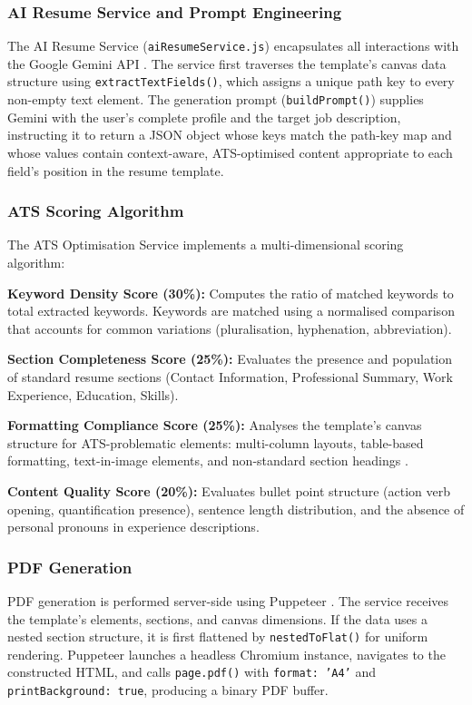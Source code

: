 \documentclass[12pt, a4paper, oneside]{report}
\begin{document}
\subsubsection{AI Resume Service and Prompt Engineering}

The AI Resume Service (\texttt{aiResumeService.js}) encapsulates all interactions with the Google Gemini API \cite{gemini2023}. The service first traverses the template's canvas data structure using \texttt{extractTextFields()}, which assigns a unique path key to every non-empty text element. The generation prompt (\texttt{buildPrompt()}) supplies Gemini with the user's complete profile and the target job description, instructing it to return a JSON object whose keys match the path-key map and whose values contain context-aware, ATS-optimised content appropriate to each field's position in the resume template.

\subsubsection{ATS Scoring Algorithm}

The ATS Optimisation Service \cite{jobscan2021} implements a multi-dimensional scoring algorithm:

\textbf{Keyword Density Score (30\%):} Computes the ratio of matched keywords to total extracted keywords. Keywords are matched using a normalised comparison that accounts for common variations (pluralisation, hyphenation, abbreviation).

\textbf{Section Completeness Score (25\%):} Evaluates the presence and population of standard resume sections (Contact Information, Professional Summary, Work Experience, Education, Skills).

\textbf{Formatting Compliance Score (25\%):} Analyses the template's canvas structure for ATS-problematic elements: multi-column layouts, table-based formatting, text-in-image elements, and non-standard section headings \cite{resumeworded2022}.

\textbf{Content Quality Score (20\%):} Evaluates bullet point structure (action verb opening, quantification presence), sentence length distribution, and the absence of personal pronouns in experience descriptions.

\subsubsection{PDF Generation}

PDF generation is performed server-side using Puppeteer \cite{puppeteer2024}. The service receives the template's elements, sections, and canvas dimensions. If the data uses a nested section structure, it is first flattened by \texttt{nestedToFlat()} for uniform rendering. Puppeteer launches a headless Chromium instance, navigates to the constructed HTML, and calls \texttt{page.pdf()} with \texttt{format: 'A4'} and \texttt{printBackground: true}, producing a binary PDF buffer.
\end{document}
